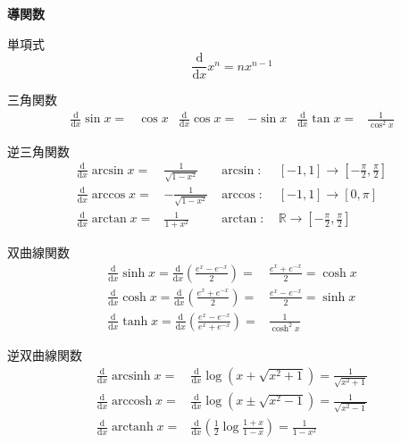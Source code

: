 \documentclass[12pt,b5paper]{ltjsarticle}
\DeclareMathOperator{\arcsinh}{arcsinh}
\DeclareMathOperator{\arccosh}{arccosh}
\DeclareMathOperator{\arctanh}{arctanh}
\begin{document}
\hrulefill
\textbf{導関数}
\hrulefill


単項式
\begin{equation}
 \frac{\mathrm{d}}{\mathrm{d}x}
  x^n = n x^{n-1}
\end{equation}


 三角関数
\begin{align}
 \frac{\mathrm{d}}{\mathrm{d}x}
  \sin x =& \cos x
& %
 \frac{\mathrm{d}}{\mathrm{d}x}
  \cos x =& -\sin x
& %
 \frac{\mathrm{d}}{\mathrm{d}x}
  \tan x =& \frac{1}{\cos^2 x}
\end{align}


逆三角関数
\begin{align}
 \frac{\mathrm{d}}{\mathrm{d}x}
  \arcsin x =& \frac{1}{\sqrt{1-x^2}} & \arcsin :&\ [-1,1]\to\left[-\frac{\pi}{2},\frac{\pi}{2}\right]\\
%
 \frac{\mathrm{d}}{\mathrm{d}x}
  \arccos x =& -\frac{1}{\sqrt{1-x^2}} & \arccos :&\ [-1,1]\to[0,\pi]\\
%
 \frac{\mathrm{d}}{\mathrm{d}x}
  \arctan x =& \frac{1}{1+x^2} & \arctan :&\ \mathbb{R}\to\left[-\frac{\pi}{2},\frac{\pi}{2}\right]
\end{align}


双曲線関数
\begin{align}
 \frac{\mathrm{d}}{\mathrm{d}x}
  \sinh x = \frac{\mathrm{d}}{\mathrm{d}x}\left(\frac{e^x-e^{-x}}{2}\right)
 =& \frac{e^x+e^{-x}}{2} = \cosh x\\
%
 \frac{\mathrm{d}}{\mathrm{d}x}
  \cosh x = \frac{\mathrm{d}}{\mathrm{d}x}\left(\frac{e^x+e^{-x}}{2}\right)
 =& \frac{e^x-e^{-x}}{2} = \sinh x\\
%
 \frac{\mathrm{d}}{\mathrm{d}x}
  \tanh x = \frac{\mathrm{d}}{\mathrm{d}x}\left(\frac{e^x-e^{-x}}{e^x+e^{-x}}\right)
 =& \frac{1}{\cosh^2 x}
\end{align}

逆双曲線関数
\begin{align}
 \frac{\mathrm{d}}{\mathrm{d}x}
  \arcsinh x
 =& \frac{\mathrm{d}}{\mathrm{d}x}\log \left( x+ \sqrt{x^2+1} \right)
 = \frac{1}{\sqrt{x^2 +1}} \\
%
 \frac{\mathrm{d}}{\mathrm{d}x}
  \arccosh x
 =& \frac{\mathrm{d}}{\mathrm{d}x}\log \left( x\pm \sqrt{x^2-1} \right)
 = \frac{1}{\sqrt{x^2 -1}} \\
%
 \frac{\mathrm{d}}{\mathrm{d}x}
  \arctanh x
 =& \frac{\mathrm{d}}{\mathrm{d}x}\left( \frac{1}{2}\log \frac{1+x}{1-x} \right)
 = \frac{1}{1-x^2}
\end{align}
\end{document}
